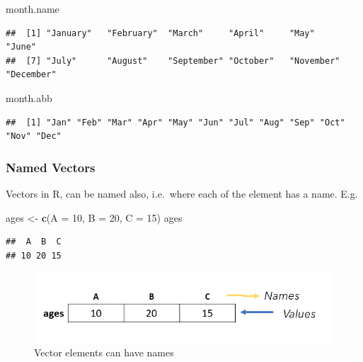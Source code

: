 \documentclass[
]{book}
\newenvironment{Shaded}{\begin{snugshade}}{\end{snugshade}}
\newcommand{\AttributeTok}[1]{\textcolor[rgb]{0.13,0.29,0.53}{#1}}
\newcommand{\DecValTok}[1]{\textcolor[rgb]{0.00,0.00,0.81}{#1}}
\newcommand{\FunctionTok}[1]{\textcolor[rgb]{0.13,0.29,0.53}{\textbf{#1}}}
\newcommand{\NormalTok}[1]{#1}
\newcommand{\OtherTok}[1]{\textcolor[rgb]{0.56,0.35,0.01}{#1}}
\begin{document}
\begin{Shaded}
\begin{Highlighting}[]
\NormalTok{month.name}
\end{Highlighting}
\end{Shaded}

\begin{verbatim}
##  [1] "January"   "February"  "March"     "April"     "May"       "June"     
##  [7] "July"      "August"    "September" "October"   "November"  "December"
\end{verbatim}

\begin{Shaded}
\begin{Highlighting}[]
\NormalTok{month.abb}
\end{Highlighting}
\end{Shaded}

\begin{verbatim}
##  [1] "Jan" "Feb" "Mar" "Apr" "May" "Jun" "Jul" "Aug" "Sep" "Oct" "Nov" "Dec"
\end{verbatim}

\hypertarget{named-vectors}{%
\subsubsection{Named Vectors}\label{named-vectors}}

Vectors in R, can be named also, i.e.~where each of the element has a name. E.g.

\begin{Shaded}
\begin{Highlighting}[]
\NormalTok{ages }\OtherTok{\textless{}{-}} \FunctionTok{c}\NormalTok{(}\AttributeTok{A =} \DecValTok{10}\NormalTok{, }\AttributeTok{B =} \DecValTok{20}\NormalTok{, }\AttributeTok{C =} \DecValTok{15}\NormalTok{)}
\NormalTok{ages}
\end{Highlighting}
\end{Shaded}

\begin{verbatim}
##  A  B  C 
## 10 20 15
\end{verbatim}

\begin{figure}

{\centering \includegraphics[width=0.6\linewidth]{images/named_vector} 

}

\caption{Vector elements can have names}\label{fig:namedvec}
\end{figure}
\end{document}
